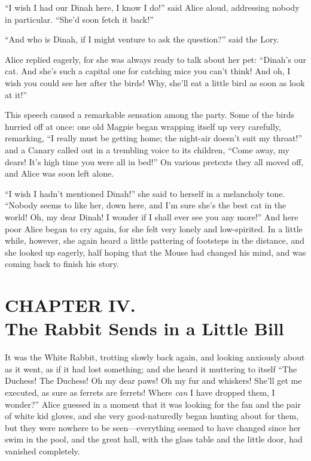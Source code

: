 \documentclass[11pt,openany,oneside]{book}
\begin{document}
“I wish I had our Dinah here, I know I do!” said Alice aloud, addressing nobody in particular. “She’d soon fetch it back!” 

“And who is Dinah, if I might venture to ask the question?” said the Lory. 

Alice replied eagerly, for she was always ready to talk about her pet: “Dinah’s our cat. And she’s such a capital one for catching mice you can’t think! And oh, I wish you could see her after the birds! Why, she’ll eat a little bird as soon as look at it!” 

This speech caused a remarkable sensation among the party. Some of the birds hurried off at once: one old Magpie began wrapping itself up very carefully, remarking, “I really must be getting home; the night-air doesn’t suit my throat!” and a Canary called out in a trembling voice to its children, “Come away, my dears! It’s high time you were all in bed!” On various pretexts they all moved off, and Alice was soon left alone. 

“I wish I hadn’t mentioned Dinah!” she said to herself in a melancholy tone. “Nobody seems to like her, down here, and I’m sure she’s the best cat in the world! Oh, my dear Dinah! I wonder if I shall ever see you any more!” And here poor Alice began to cry again, for she felt very lonely and low-spirited. In a little while, however, she again heard a little pattering of footsteps in the distance, and she looked up eagerly, half hoping that the Mouse had changed his mind, and was coming back to finish his story. 


\clearpage{}
{}
\chapter*{CHAPTER IV.\\  The Rabbit Sends in a Little Bill}
\leavevmode\hypertarget{d7.fp46523}{}It was the White Rabbit, trotting slowly back again, and looking anxiously about as it went, as if it had lost something; and she heard it muttering to itself “The Duchess! The Duchess! Oh my dear paws! Oh my fur and whiskers! She’ll get me executed, as sure as ferrets are ferrets! Where {\em can\/} I have dropped them, I wonder?” Alice guessed in a moment that it was looking for the fan and the pair of white kid gloves, and she very good-naturedly began hunting about for them, but they were nowhere to be seen—everything seemed to have changed since her swim in the pool, and the great hall, with the glass table and the little door, had vanished completely. 
\end{document}
